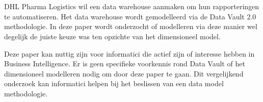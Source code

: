
%
%

%



\chapter*{}

DHL Pharma Logistics wil een data warehouse aanmaken om hun rapporteringen te automatiseren. Het data warehouse wordt gemodelleerd via de Data Vault 2.0 methodologie. In deze paper wordt onderzocht of modelleren via deze manier wel degelijk de juiste keuze was ten opzichte van het dimensioneel model.

Deze paper kan nuttig zijn voor informatici die actief zijn of interesse hebben in Business Intelligence. Er is geen specifieke voorkennis rond Data Vault of het dimensioneel modelleren nodig om door deze paper te gaan. Dit vergelijkend onderzoek kan informatici helpen bij het beslissen van een data model methodologie.

